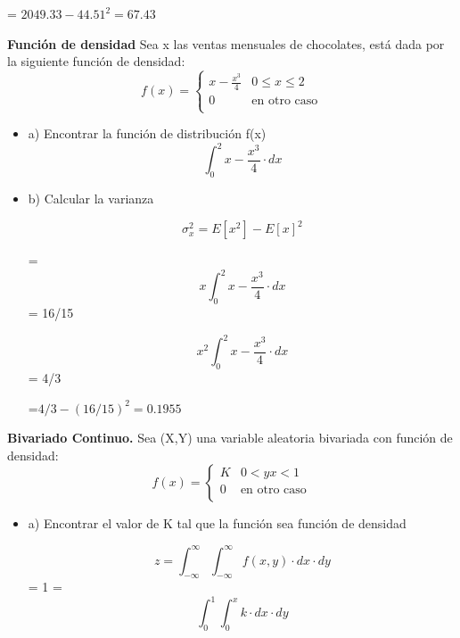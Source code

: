 \documentclass{../oxmathproblems}
\begin{document}
\begin{questions}
= $ 2049.33 - 44.51^2 = 67.43$ 


\miquestion \textbf{Función de densidad} Sea x las ventas mensuales de chocolates, está dada por la siguiente función de densidad: 
\[ 
f(x) = 
     \begin{cases}
       x- \frac{x^3}{4}  & 0  \leq x  \leq 2 \\
       0 & \text{en otro caso} \\
     \end{cases}
\]
$$$$
\begin{itemize}
\item  a) Encontrar la función de distribución f(x) 
\begin{equation}
 \int_{0}^{2} x- \frac{x^3}{4} \cdot dx
\end{equation} 


\item  b) Calcular la varianza

$$ \sigma_x^2 = E[x^2]-E[x]^2 $$ 

= \begin{equation}
 x \int_{0}^{2} x- \frac{x^3}{4} \cdot dx
\end{equation}
= 16/15


\begin{equation}
 x^2 \int_{0}^{2} x- \frac{x^3}{4} \cdot dx
\end{equation} 
= 4/3


=$  4/3 - (16/15)^2 = 0.1955 $
\end{itemize}

\miquestion \textbf {Bivariado Continuo. } Sea (X,Y) una variable aleatoria bivariada con función de densidad: 
\[ 
f(x) = 
     \begin{cases}
        K  & 0  < {y}   
        {x} < 1 \\
       0 & \text{en otro caso} \\
     \end{cases}
\]


\begin{itemize}
\item  a) Encontrar el valor de K tal que la función sea función de densidad 

\begin{equation}
z = \int _{-\infty}^{\infty} \int _{-\infty}^{\infty} f(x,y) \cdot dx \cdot dy
\end{equation} 
= 1 
= 
 \begin{equation}
 \int _{0}^{1} \int _{0}^{x} k \cdot dx \cdot dy
\end{equation}



\end{itemize}
\end{questions}
\end{document}
